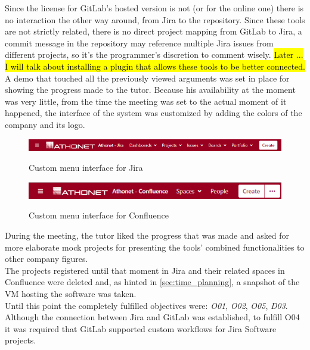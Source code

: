 	Since the license for GitLab's hosted version is not  (or  for the online one) there is no interaction the other way around, from Jira to the repository\cite{jira_development_panel}.
	Since these tools are not strictly related, there is no direct project mapping from GitLab to Jira, a commit message in the repository may reference multiple Jira issues from different projects, so it's the programmer's discretion to comment wisely.
	\hl{Later ... I will talk about installing a plugin that allows these tools to be better connected.}\\
	A demo that touched all the previously viewed arguments was set in place for showing the progress made to the tutor.	
	Because his availability at the moment was very little, from the time the meeting was set to the actual moment of it happened, the interface of the system was customized by adding the colors of the company and its logo.
	\begin{figure}[H]
		\centering
		\includegraphics[width=\textwidth]{resources/jira_custom}\\
		\caption{Custom menu interface for Jira}
	\end{figure}
	\vspace{-.5cm}
	\begin{figure}[H]
		\centering
		\includegraphics[width=.85\textwidth]{resources/confluence_custom}\\
		\caption{Custom menu interface for Confluence}
	\end{figure}
	During the meeting, the tutor liked the progress that was made and asked for more elaborate mock projects for presenting the tools' combined functionalities to other company figures.\\
	The projects registered until that moment in Jira and their related spaces in Confluence were deleted and, as hinted in \ref{sec:time_planning}, a snapshot of the VM hosting the software was taken.\\
	Until this point the completely fulfilled objectives were: \textit{O01}, \textit{O02}, \textit{O05}, \textit{D03}.\\
	Although the connection between Jira and GitLab was established, to fulfill O04 it was required that GitLab supported custom workflows for Jira Software projects.
	
